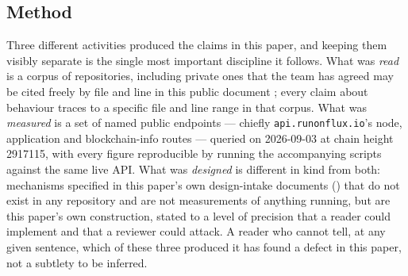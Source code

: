 \subsection{Method}
\label{sec:intro-method}

Three different activities produced the claims in this paper, and keeping them visibly separate is
the single most important discipline it follows. What was \emph{read} is a corpus of \Flux
repositories, including private ones that the team has agreed may be cited freely by file and line in
this public document ; every \shipped claim about behaviour
traces to a specific file and line range in that corpus. What was \emph{measured} is a set of named public
endpoints — chiefly \texttt{api.\allowbreak{}runonflux.\allowbreak{}io}'s node, application and blockchain-info routes — queried
on 2026-09-03 at chain height \num{2917115}, with every figure reproducible by running the
accompanying scripts against the same live API. What was \emph{designed} is different in kind from
both: mechanisms specified in this paper's own design-intake documents
() that do not exist in any repository and are not measurements of
anything running, but are this paper's own construction, stated to a level of precision that a reader
could implement and that a reviewer could attack. A reader who cannot tell, at any given sentence,
which of these three produced it has found a defect in this paper, not a subtlety to be inferred.

\FloatBarrier
